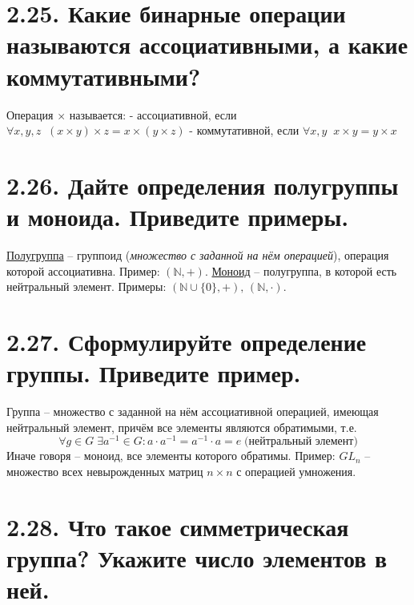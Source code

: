 \documentclass{article}
\begin{document}
\section*{\LARGE 2.25. Какие бинарные операции называются ассоциативными, а какие коммутативными?  }

Операция $\times$ называется:
\newline - ассоциативной, если $\forall x,y,z \;\; (x \times y) \times z = x \times (y \times z)$
\newline - коммутативной, если $\forall x,y \;\; x \times y = y \times x$

\section*{\LARGE 2.26. Дайте определения полугруппы и моноида. Приведите примеры. }

\underline{Полугруппа} -- группоид (\textit{множество с заданной на нём операцией}), операция которой ассоциативна. Пример: $(\mathbb{N}, +)$.
\newline \underline{Моноид} -- полугруппа, в которой есть нейтральный элемент.
\newline Примеры: $(\mathbb{N}\cup \{0\}, +),\, (\mathbb{N}, \cdot)$.

\section*{\LARGE 2.27. Сформулируйте определение группы. Приведите пример. }

Группа -- множество с заданной на нём ассоциативной операцией, имеющая нейтральный элемент, причём все элементы являются обратимыми, т.е. 
$$
\forall g \in G \; \exists a^{-1} \in G : a \cdot a^{-1} = a^{-1} \cdot a = e \; \mbox{(нейтральный элемент)}
$$
Иначе говоря -- моноид, все элементы которого обратимы.
\newline Пример: $GL_n$ -- множество всех невырожденных матриц $n \times n$ с операцией умножения.

\section*{\LARGE 2.28. Что такое симметрическая группа? Укажите число элементов в ней.  }
\end{document}
